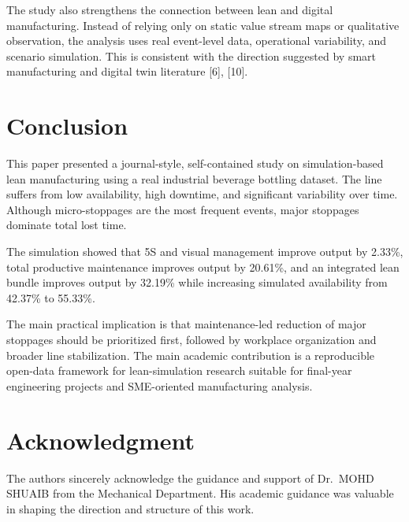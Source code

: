 \documentclass[12pt,a4paper]{article}
\begin{document}
The study also strengthens the connection between lean and digital manufacturing. Instead of relying only on static value stream maps or qualitative observation, the analysis uses real event-level data, operational variability, and scenario simulation. This is consistent with the direction suggested by smart manufacturing and digital twin literature [6], [10].

\section{Conclusion}
This paper presented a journal-style, self-contained study on simulation-based lean manufacturing using a real industrial beverage bottling dataset. The line suffers from low availability, high downtime, and significant variability over time. Although micro-stoppages are the most frequent events, major stoppages dominate total lost time.

The simulation showed that 5S and visual management improve output by 2.33\%, total productive maintenance improves output by 20.61\%, and an integrated lean bundle improves output by 32.19\% while increasing simulated availability from 42.37\% to 55.33\%.

The main practical implication is that maintenance-led reduction of major stoppages should be prioritized first, followed by workplace organization and broader line stabilization. The main academic contribution is a reproducible open-data framework for lean-simulation research suitable for final-year engineering projects and SME-oriented manufacturing analysis.

\section*{Acknowledgment}
The authors sincerely acknowledge the guidance and support of Dr.\ MOHD SHUAIB from the Mechanical Department. His academic guidance was valuable in shaping the direction and structure of this work.
\end{document}
